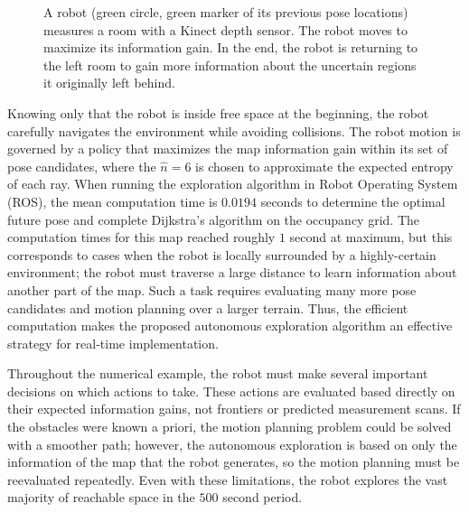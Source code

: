 \documentclass[letterpaper, 10pt, conference]{ieeeconf}
\begin{document}
\begin{figure}
{{	}
}
\caption{A robot (green circle, green marker of its previous pose locations) measures a room with a Kinect depth sensor. The robot moves to maximize its information gain. In the end, the robot is returning to the left room to gain more information about the uncertain regions it originally left behind.%
}
\label{fig:AutonomousExploration}
\end{figure}

Knowing only that the robot is inside free space at the beginning, the robot carefully navigates the environment while avoiding collisions. The robot motion is governed by a policy that maximizes the map information gain within its set of pose candidates, where the $\hat n=6$ is chosen to approximate the expected entropy of each ray. 
When running the exploration algorithm in Robot Operating System (ROS), the mean computation time is $0.0194$ seconds to determine the optimal future pose and complete Dijkstra's algorithm on the occupancy grid.
The computation times for this map reached roughly $1$ second at maximum, but this corresponds to cases when the robot is locally surrounded by a highly-certain environment; the robot must traverse a large distance to learn information about another part of the map. Such a task requires evaluating many more pose candidates and motion planning over a larger terrain. Thus, the efficient computation makes the proposed autonomous exploration algorithm an effective strategy for real-time implementation.

Throughout the numerical example, the robot must make several important decisions on which actions to take. These actions are evaluated based directly on their expected information gains, not frontiers or predicted measurement scans. If the obstacles were known a priori, the motion planning problem could be solved with a smoother path; however, the autonomous exploration is based on only the information of the map that the robot generates, so the motion planning must be reevaluated repeatedly. Even with these limitations, the robot explores the vast majority of reachable space in the $500$ second period. 
\end{document}
